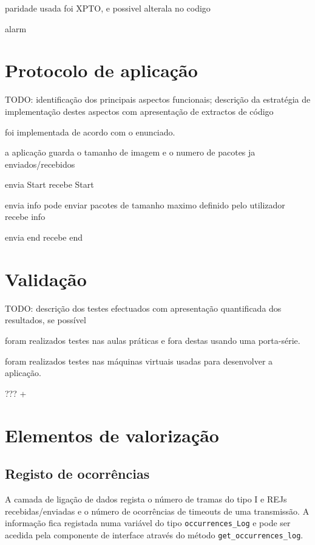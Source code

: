 \documentclass[11pt,a4paper,reqno]{report}
\numberwithin{equation}{section}
\begin{document}
paridade usada foi XPTO, e possivel alterala no codigo

alarm

\chapter{Protocolo de aplicação}

TODO: identificação dos principais aspectos funcionais; descrição da estratégia de implementação destes aspectos com apresentação de extractos de código

foi implementada de acordo com o enunciado.

a aplicação guarda o tamanho de imagem e o numero de pacotes ja enviados/recebidos

envia Start
recebe Start

envia info pode enviar pacotes de tamanho maximo definido pelo utilizador
recebe info

envia end
recebe end


\chapter{Validação}

TODO: descrição dos testes efectuados com apresentação quantificada dos resultados, se possível

foram realizados testes nas aulas práticas e fora destas usando uma porta-série.

foram realizados testes nas máquinas virtuais usadas para desenvolver a aplicação.

??? +


\chapter{Elementos de valorização}

\section{Registo de ocorrências}

A camada de ligação de dados regista o número de tramas do tipo I e REJs recebidas/enviadas e o número de ocorrências de timeouts de uma transmissão. A informação fica registada numa variável do tipo \verb|occurrences_Log| e pode ser acedida pela componente de interface através do método \verb|get_occurrences_log|.
\end{document}
